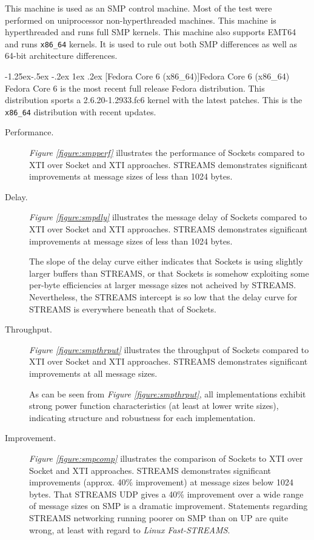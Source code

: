 \documentclass[letterpaper,final,notitlepage,twocolumn,10pt,twoside]{article}
\makeatletter
\renewcommand\subsubsection{\@startsection{subsubsection}{3}{\z@}%
                                     {-1.25ex\@plus -.5ex \@minus -.2ex}%
                                     {1ex \@plus .2ex}%
                                     {\normalfont\normalsize\bfseries}}
\makeatother
\begin{document}
This machine is used as an SMP control machine.  Most of the test were
performed on uniprocessor non-hyperthreaded machines.  This machine is
hyperthreaded and runs full SMP kernels.  This machine also supports EMT64 and
runs \texttt{x86\_64} kernels.  It is used to rule out both SMP differences as
well as 64-bit architecture differences.

\subsubsection[Fedora Core 6 (x86\_64)]{Fedora Core 6 (x86\_64)}
Fedora Core 6 is the most recent full release Fedora distribution.  This
distribution sports a 2.6.20-1.2933.fc6 kernel with the latest patches.  This is the
\texttt{x86\_64} distribution with recent updates.

\begin{description}

\item[Performance.]

\textit{Figure \ref{figure:smpperf}}
illustrates
the performance of Sockets compared to XTI over Socket and XTI approaches.
STREAMS demonstrates significant improvements at message sizes of less than
1024 bytes.

\item[Delay.]

\textit{Figure \ref{figure:smpdly}}
illustrates
the message delay of Sockets compared to XTI over Socket and XTI approaches.
STREAMS demonstrates significant improvements at message sizes of less than
1024 bytes.

The slope of the delay curve either indicates that Sockets is using slightly
larger buffers than STREAMS, or that Sockets is somehow exploiting some
per-byte efficiencies at larger message sizes not acheived by STREAMS.
Nevertheless, the STREAMS intercept is so low that the delay curve for STREAMS
is everywhere beneath that of Sockets.

\item[Throughput.]

\textit{Figure \ref{figure:smpthrput}}
illustrates the throughput of Sockets compared to XTI over Socket and XTI
approaches.  STREAMS demonstrates significant improvements at all message
sizes.

As can be seen from \textit{Figure \ref{figure:smpthrput}}, all
implementations exhibit strong power function characteristics (at least at
lower write sizes), indicating structure and robustness for each
implementation.

\item[Improvement.]

\textit{Figure \ref{figure:smpcomp}}
illustrates
the comparison of Sockets to XTI over Socket and XTI approaches.  STREAMS
demonstrates significant improvements (approx. 40\% improvement) at message
sizes below 1024 bytes.  That STREAMS UDP gives a 40\% improvement over a wide
range of message sizes on SMP is a dramatic improvement.  Statements regarding
STREAMS networking running poorer on SMP than on UP are quite wrong, at least
with regard to \textsl{Linux Fast-STREAMS}.

\end{description}
\end{document}
